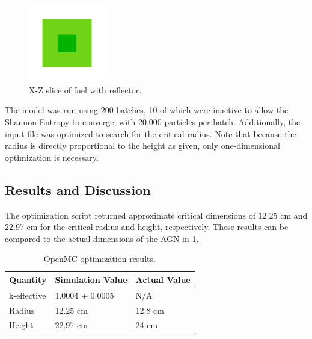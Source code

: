 \documentclass{anstrans}
\begin{document}
    \begin{figure}[!htb]
        \centering
        \includegraphics[width=0.3\textwidth ]{plot_2}
        \caption{X-Z slice of fuel with reflector.}
        \label{fig:xz}
    \end{figure}

    The model was run using 200 batches, 10 of which were inactive to allow the Shannon Entropy to converge, with 20,000 particles per batch.
    Additionally, the input file was optimized to search for the critical radius.
    Note that because the radius is directly proportional to the height as given, only one-dimensional optimization is necessary.

    \subsection{Results and Discussion}
    The optimization script returned approximate critical dimensions of 12.25 cm and 22.97 cm for the critical radius and height, respectively.
    These results can be compared to the actual dimensions of the AGN in \cref{tab:mc results}.
    \begin{table}
        \centering
        \begin{tabular}{lll}
            \toprule
            \textbf{Quantity} & \textbf{Simulation Value} & \textbf{Actual Value} \\
            \midrule
            k-effective       & 1.0004 $\pm$ 0.0005       & N/A                   \\
            Radius            & 12.25 cm                  & 12.8 cm               \\
            Height            & 22.97 cm                  & 24 cm                 \\
            \bottomrule
        \end{tabular}
        \caption{OpenMC optimization results.}
        \label{tab:mc results}
    \end{table}
\end{document}
